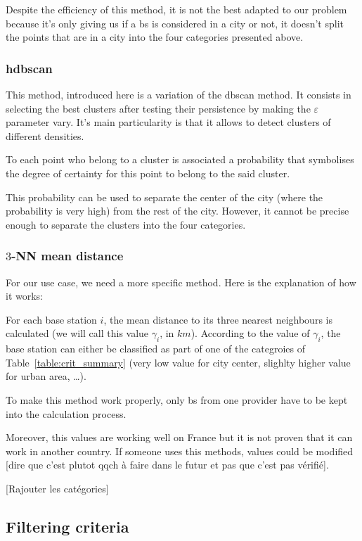 \documentclass[lettersize,journal,english]{IEEEtran}
\begin{document}
Despite the efficiency of this method, it is not the best adapted to our problem because it's only giving us if a \acrshort{bs} is considered 
in a city or not, it doesn't split the points that are in a city into the four categories presented above.

\subsubsection{\acrshort{hdbscan}}
This method, introduced here \cite{10.1007/978-3-642-37456-2_14} is a variation of the \acrshort{dbscan} method. It consists
in selecting the best clusters after testing their persistence by making the $\varepsilon$ parameter vary. It's main particularity
is that it allows to detect clusters of different densities.

To each point who belong to a cluster is associated a probability that symbolises the degree of certainty for this point to belong
to the said cluster.

This probability can be used to separate the center of the city (where the probability is very high) from the rest of the city. However,
it cannot be precise enough to separate the clusters into the four categories.

\subsubsection{$3$-NN mean distance}
For our use case, we need a more specific method. Here is the explanation of how it works:

For each base station $i$, the mean distance to its three nearest neighbours is calculated (we will call this value $\gamma_i$, in 
$\unit{km}$). According to the value of $\gamma_i$, the base station can either be classified as part of one of the categroies of 
Table~\ref{table:crit_summary} (very low value for city center, slighlty higher value for urban area, \dots).

To make this method work properly, only \acrshort{bs} from one provider have to be kept into the calculation process.

Moreover, this values are working well on France but it is not proven that it can work in another country. If someone uses this methods, 
values could be modified [dire que c'est plutot qqch à faire dans le futur et pas que c'est pas vérifié].

[Rajouter les catégories]

\subsection{Filtering criteria}
\end{document}
